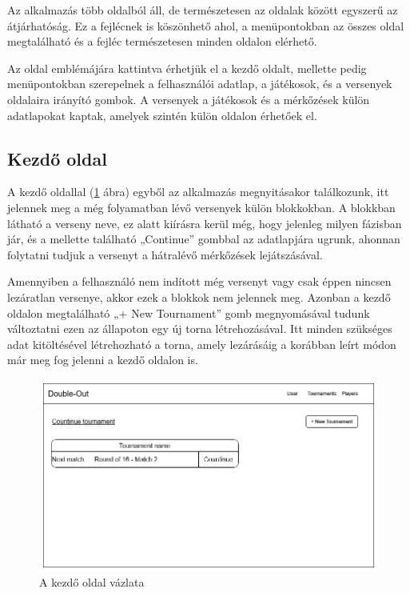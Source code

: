 Az alkalmazás több oldalból áll, de természetesen az oldalak között egyszerű az átjárhatóság. Ez a fejlécnek is köszönhető ahol, a menüpontokban az összes oldal megtalálható és a fejléc természetesen minden oldalon elérhető.

Az oldal emblémájára kattintva érhetjük el a kezdő oldalt, mellette pedig menüpontokban szerepelnek a felhasználói adatlap, a játékosok, és a versenyek oldalaira irányító gombok. A versenyek a játékosok és a mérkőzések külön adatlapokat kaptak, amelyek szintén külön oldalon érhetőek el.

\subsection{Kezdő oldal}
A kezdő oldallal (\ref{fig:home} ábra) egyből az alkalmazás megnyitásakor találkozunk, itt jelennek meg a még folyamatban lévő versenyek külön blokkokban. A blokkban látható a verseny neve, ez alatt kiírásra kerül még, hogy jelenleg milyen fázisban jár, és a mellette található „Continue” gombbal az adatlapjára ugrunk, ahonnan folytatni tudjuk a versenyt a hátralévő mérkőzések lejátszásával.

Amennyiben a felhasználó nem indított még versenyt vagy csak éppen nincsen lezáratlan versenye, akkor ezek a blokkok nem jelennek meg. Azonban a kezdő oldalon megtalálható „+ New Tournament” gomb megnyomásával tudunk változtatni ezen az állapoton egy új torna létrehozásával. Itt minden szükséges adat kitöltésével létrehozható a torna, amely lezárásáig a korábban leírt módon már meg fog jelenni a kezdő oldalon is.

\begin{figure}[h]
\centering
\includegraphics[scale=0.5]{images/HomePage.png}
\caption{A kezdő oldal vázlata}
\label{fig:home}
\end{figure}

